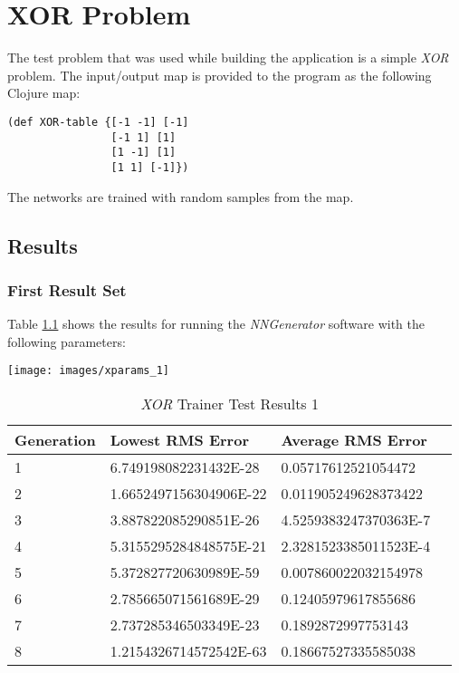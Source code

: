 \chapter[XOR Problem]{XOR Problem}
The test problem that was used while building the application is a
simple {\it XOR} problem. 
The input/output map is provided to the program as the following
Clojure map: 

\lstset{language=Clojure}

\begin{lstlisting}
(def XOR-table {[-1 -1] [-1]
                [-1 1] [1]
                [1 -1] [1]
                [1 1] [-1]})
\end{lstlisting}

The networks are trained with random samples from the map.

\section{Results}

\subsection{First Result Set}

Table \ref{xor1} shows the results for running the {\it NNGenerator}
software with the following parameters: 

\begin{center}
\texttt{[image: images/xparams\_1]}
\end{center}

\begin{center}
    \begin{longtable}{ | l | l | l | l |}
      \caption{{\it XOR} Trainer Test Results 1} \label{xor1} \\
    \hline
    Generation & Lowest RMS Error & Average RMS Error \\ \hline
1 &	6.749198082231432E-28 &	0.05717612521054472 \\ \hline
2 &	1.6652497156304906E-22 &	0.011905249628373422 \\ \hline
3 &	3.887822085290851E-26 &	4.5259383247370363E-7 \\ \hline
4 &	5.3155295284848575E-21 &	2.3281523385011523E-4 \\ \hline
5 &	5.372827720630989E-59 &	0.007860022032154978 \\ \hline
6 &	2.785665071561689E-29 &	0.12405979617855686 \\ \hline
7 &	2.737285346503349E-23 &	0.1892872997753143 \\ \hline
8 &	1.2154326714572542E-63 &	0.18667527335585038 \\ \hline   
\end{longtable}
\end{center}

